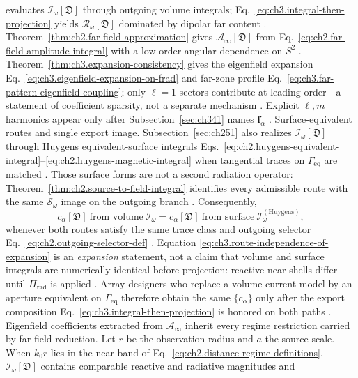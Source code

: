evaluates \(\mathcal{I}_\omega[\mathfrak{D}]\) through outgoing volume integrals;
Eq.~\eqref{eq:ch3.integral-then-projection} yields \(\mathcal{R}_\omega[\mathfrak{D}]\) dominated
by dipolar far content . Theorem~\ref{thm:ch2.far-field-approximation}
gives \(\mathcal{A}_\infty[\mathfrak{D}]\) from
Eq.~\eqref{eq:ch2.far-field-amplitude-integral} with a low-order angular dependence on
\(S^{2}\) . Theorem~\ref{thm:ch3.expansion-consistency} gives the eigenfield expansion
Eq.~\eqref{eq:ch3.eigenfield-expansion-on-frad} and far-zone profile
Eq.~\eqref{eq:ch3.far-pattern-eigenfield-coupling}; only \(\ell=1\) sectors contribute at leading
order---a statement of coefficient sparsity, not a separate mechanism . Explicit \(\ell,m\) harmonics appear
only after Subsection~\ref{sec:ch341} names \(\mathbf{f}_\alpha\) .
Surface-equivalent routes and single export image. Subsection~\ref{sec:ch251} also realizes \(\mathcal{I}_\omega[\mathfrak{D}]\) through Huygens
equivalent-surface integrals Eqs.~\eqref{eq:ch2.huygens-equivalent-integral}--\eqref{eq:ch2.huygens-magnetic-integral}
when tangential traces on \(\Gamma_{\mathrm{eq}}\) are matched .
Those surface forms are not a second radiation operator: Theorem~\ref{thm:ch2.source-to-field-integral}
identifies every admissible route with the same \(\mathcal{S}_\omega\) image on the outgoing branch
. Consequently,
\begin{equation}
\label{eq:ch3.route-independence-of-expansion}
c_\alpha[\mathfrak{D}]
\ \text{from volume}\ \mathcal{I}_\omega
=
c_\alpha[\mathfrak{D}]
\ \text{from surface}\ \mathcal{I}_\omega^{\mathrm{(Huygens)}},
\end{equation}
whenever both routes satisfy the same trace class and outgoing selector
Eq.~\eqref{eq:ch2.outgoing-selector-def} . Equation
\eqref{eq:ch3.route-independence-of-expansion} is an \emph{expansion} statement, not a claim that
volume and surface integrals are numerically identical before projection: reactive near shells differ
until \(\Pi_{\mathrm{rad}}\) is applied . Array designers who replace a volume
current model by an aperture equivalent on \(\Gamma_{\mathrm{eq}}\) therefore obtain the same
\(\{c_\alpha\}\) only after the export composition Eq.~\eqref{eq:ch3.integral-then-projection} is
honored on both paths .
Eigenfield coefficients extracted from \(\mathcal{A}_\infty\) inherit every regime restriction
carried by far-field reduction. Let \(r\) be the observation radius and \(a\) the source scale.
When \(k_0 r\) lies in the near band of Eq.~\eqref{eq:ch2.distance-regime-definitions},
\(\mathcal{I}_\omega[\mathfrak{D}]\) contains comparable reactive and radiative magnitudes and

